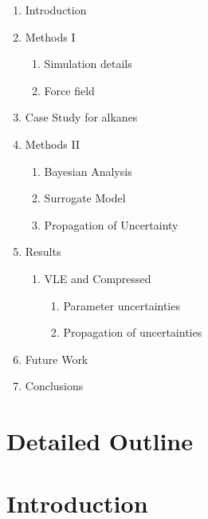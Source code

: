 \documentclass[preprint,letterpaper,floatfix,citeautoscript,aip,jcp]{revtex4-1}
\begin{document}
\begin{enumerate}
	\item Introduction
	\item Methods I
	\begin{enumerate}
		\item Simulation details
		\item Force field
	\end{enumerate}
	\item Case Study for alkanes
	\item Methods II
	\begin{enumerate}
		\item Bayesian Analysis
		\item Surrogate Model
		\item Propagation of Uncertainty
	\end{enumerate}
	\item Results
	\begin{enumerate}
		\item VLE and Compressed
		\begin{enumerate}
			\item Parameter uncertainties
			\item Propagation of uncertainties
		\end{enumerate}
	\end{enumerate}
	\item Future Work
	\item Conclusions	
\end{enumerate}


\section*{Detailed Outline}

\section{Introduction}
\end{document}
